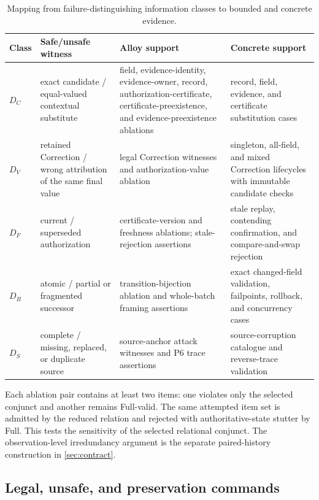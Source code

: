 \begin{table}[t]
\centering
\footnotesize
\caption{Mapping from failure-distinguishing information classes to bounded and concrete evidence.}
\label{tab:distinction-evidence}
\begin{tabularx}{\textwidth}{@{}l>{\raggedright\arraybackslash}p{}>{\raggedright\arraybackslash}p{}>{\raggedright\arraybackslash}X@{}}
\toprule
Class & Safe/unsafe witness & Alloy support & Concrete support \\
\midrule
$D_C$ & exact candidate / equal-valued contextual substitute & field, evidence-identity, evidence-owner, record, authorization-certificate, certificate-preexistence, and evidence-preexistence ablations & record, field, evidence, and certificate substitution cases \\
$D_V$ & retained Correction / wrong attribution of the same final value & legal Correction witnesses and authorization-value ablation & singleton, all-field, and mixed Correction lifecycles with immutable candidate checks \\
$D_F$ & current / superseded authorization & certificate-version and freshness ablations; stale-rejection assertions & stale replay, contending confirmation, and compare-and-swap rejection \\
$D_B$ & atomic / partial or fragmented successor & transition-bijection ablation and whole-batch framing assertions & exact changed-field validation, failpoints, rollback, and concurrency cases \\
$D_S$ & complete / missing, replaced, or duplicate source & source-anchor attack witnesses and P6 trace assertions & source-corruption catalogue and reverse-trace validation \\
\bottomrule
\end{tabularx}
\end{table}

Each ablation pair contains at least two items: one violates only the selected conjunct and another remains Full-valid. The same attempted item set is admitted by the reduced relation and rejected with authoritative-state stutter by Full. This tests the sensitivity of the selected relational conjunct. The observation-level irredundancy argument is the separate paired-history construction in \cref{sec:contract}.

\subsection{Legal, unsafe, and preservation commands}

